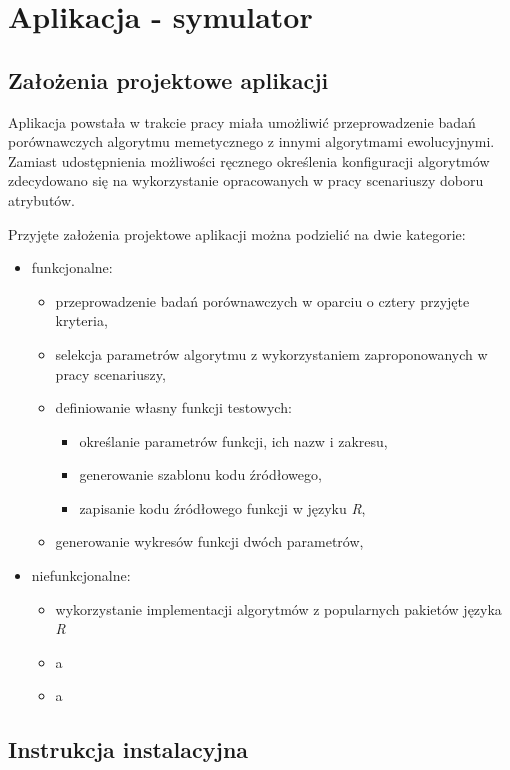 \chapter{Aplikacja - symulator}
\label{ch:dodatekA-aplikacja}
\section{Założenia projektowe aplikacji}

\par
Aplikacja powstała w trakcie pracy miała umożliwić przeprowadzenie badań porównawczych algorytmu memetycznego z innymi algorytmami ewolucyjnymi. Zamiast udostępnienia możliwości ręcznego określenia konfiguracji algorytmów zdecydowano się na wykorzystanie opracowanych w pracy scenariuszy doboru atrybutów. 

\par
Przyjęte założenia projektowe aplikacji można podzielić na dwie kategorie:
\begin{itemize}
\item funkcjonalne:
\begin{itemize}
\item przeprowadzenie badań porównawczych w oparciu o cztery przyjęte kryteria,
\item selekcja parametrów algorytmu z wykorzystaniem zaproponowanych w pracy scenariuszy,
\item definiowanie własny funkcji testowych:
\begin{itemize}
\item określanie parametrów funkcji, ich nazw i zakresu,
\item generowanie szablonu kodu źródłowego,
\item zapisanie kodu źródłowego funkcji w języku \emph{R},
\end{itemize}
\item generowanie wykresów funkcji dwóch parametrów,


\end{itemize}
\item niefunkcjonalne:
\begin{itemize}
\item wykorzystanie implementacji algorytmów z popularnych pakietów języka \emph{R}
\item a
\item a
\end{itemize}
\end{itemize}

\section{Instrukcja instalacyjna}


